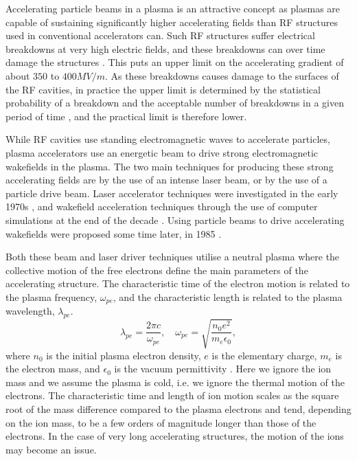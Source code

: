 Accelerating particle beams in a plasma is an attractive concept as plasmas are capable of sustaining significantly higher accelerating fields than RF structures used in conventional accelerators can. Such RF structures suffer electrical breakdowns at very high electric fields, and these breakdowns can over time damage the structures \cite{braun:2003}. This puts an upper limit on the accelerating gradient of about $350$ to $400\unit{MV/m}$. As these breakdowns causes damage to the surfaces of the RF cavities, in practice the upper limit is determined by the statistical probability of a breakdown and the acceptable number of breakdowns in a given period of time \cite{pritzkau:2002}, and the practical limit is therefore lower.

While RF cavities use standing electromagnetic waves to accelerate particles, plasma accelerators use an energetic beam to drive strong electromagnetic wakefields in the plasma. The two main techniques for producing these strong accelerating fields are by the use of an intense laser beam, or by the use of a particle drive beam. Laser accelerator techniques were investigated in the early 1970s \cite{chan:1971, palmer:1972}, and wakefield acceleration techniques through the use of computer simulations at the end of the decade \cite{tajima:1979}. Using particle beams to drive accelerating wakefields were proposed some time later, in 1985 \cite{chen:1985}.

Both these beam and laser driver techniques utilise a neutral plasma where the collective motion of the free electrons define the main parameters of the accelerating structure. The characteristic time of the electron motion is related to the plasma frequency, $\omega_{pe}$, and the characteristic length is related to the plasma wavelength, $\lambda_{pe}$.
\begin{equation}
    \lambda_{pe} = \frac{2\pi c}{\omega_{pe}}, \quad
    \omega_{pe}  = \sqrt{\frac{n_{0}e^{2}}{m_{e}\epsilon_{0}}}, \label{EQ:PWFA:L0W0}
\end{equation}
where $n_{0}$ is the initial plasma electron density, $e$ is the elementary charge, $m_{e}$ is the electron mass, and $\epsilon_{0}$ is the vacuum permittivity \cite{tonks:1929, esarey:1996, pecseli:2012}. Here we ignore the ion mass and we assume the plasma is cold, i.e. we ignore the thermal motion of the electrons. The characteristic time and length of ion motion scales as the square root of the mass difference compared to the plasma electrons and tend, depending on the ion mass, to be a few orders of magnitude longer than those of the electrons. In the case of very long accelerating structures, the motion of the ions may become an issue.

